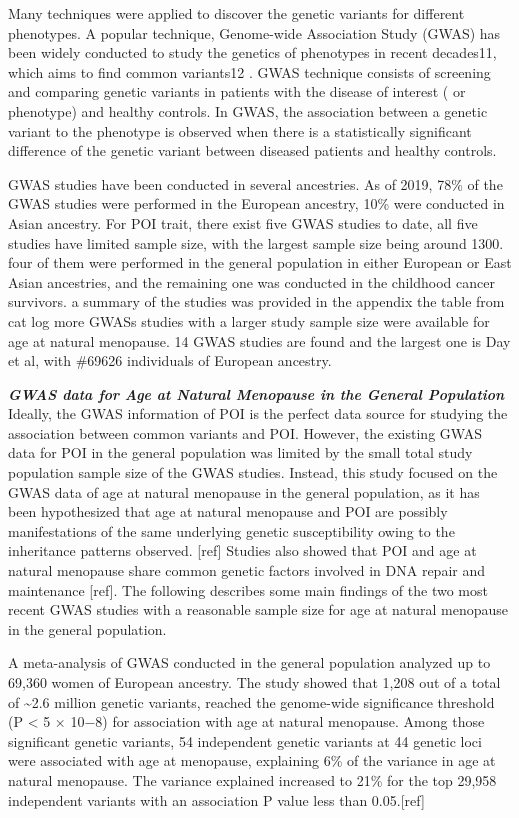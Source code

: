 \documentclass[
]{book}
\begin{document}
Many techniques were applied to discover the genetic variants for different phenotypes. A popular technique, Genome-wide Association Study (GWAS) has been widely conducted to study the genetics of phenotypes in recent decades11, which aims to find common variants12 . GWAS technique consists of screening and comparing genetic variants in patients with the disease of interest ( or phenotype) and healthy controls. In GWAS, the association between a genetic variant to the phenotype is observed when there is a statistically significant difference of the genetic variant between diseased patients and healthy controls.

GWAS studies have been conducted in several ancestries. As of 2019, 78\% of the GWAS studies were performed in the European ancestry, 10\% were conducted in Asian ancestry. For POI trait, there exist five GWAS studies to date, all five studies have limited sample size, with the largest sample size being around 1300. four of them were performed in the general population in either European or East Asian ancestries, and the remaining one was conducted in the childhood cancer survivors. a summary of the studies was provided in the appendix the table from cat log
more GWASs studies with a larger study sample size were available for age at natural menopause. 14 GWAS studies are found and the largest one is Day et al, with \#69626 individuals of European ancestry.

\textbf{\emph{GWAS data for Age at Natural Menopause in the General Population}}
Ideally, the GWAS information of POI is the perfect data source for studying the association between common variants and POI. However, the existing GWAS data for POI in the general population was limited by the small total study population sample size of the GWAS studies. Instead, this study focused on the GWAS data of age at natural menopause in the general population, as it has been hypothesized that age at natural menopause and POI are possibly manifestations of the same underlying genetic susceptibility owing to the inheritance patterns observed. {[}ref{]} Studies also showed that POI and age at natural menopause share common genetic factors involved in DNA repair and maintenance {[}ref{]}. The following describes some main findings of the two most recent GWAS studies with a reasonable sample size for age at natural menopause in the general population.

A meta-analysis of GWAS conducted in the general population analyzed up to 69,360 women of European ancestry. The study showed that 1,208 out of a total of \textasciitilde2.6 million genetic variants, reached the genome-wide significance threshold (P \textless{} 5 × 10−8) for association with age at natural menopause. Among those significant genetic variants, 54 independent genetic variants at 44 genetic loci were associated with age at menopause, explaining 6\% of the variance in age at natural menopause. The variance explained increased to 21\% for the top 29,958 independent variants with an association P value less than 0.05.{[}ref{]}
\end{document}
